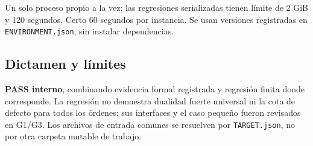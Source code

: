 Un solo proceso propio a la vez; las regresiones serializadas tienen
límite de 2 GiB y 120 segundos, Certo 60 segundos por instancia. Se usan
versiones registradas en \texttt{ENVIRONMENT.json}, sin instalar
dependencias.

\subsection{Dictamen y límites}\label{dictamen-y-luxedmites}

\textbf{PASS interno}, combinando evidencia formal registrada y
regresión finita donde corresponde. La regresión no demuestra dualidad
fuerte universal ni la cota de defecto para todos los órdenes; sus
interfaces y el caso pequeño fueron revisados en G1/G3. Los archivos de
entrada comunes se resuelven por \texttt{TARGET.json}, no por otra
carpeta mutable de trabajo.
